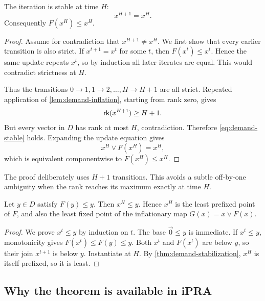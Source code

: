\begin{theorem}
\label{thm:demand-stabilization}
The iteration is stable at time \(H\):
\begin{equation}
  x^{H+1}=x^H.
  \label{eq:demand-stable}
\end{equation}
Consequently \(F(x^H)\leq x^H\).
\end{theorem}

\begin{proof}
Assume for contradiction that \(x^{H+1}\neq x^H\).  We first show that every earlier transition is also strict.  If \(x^{t+1}=x^t\) for some \(t\), then \(F(x^t)\leq x^t\).  Hence the same update repeats \(x^t\), so by induction all later iterates are equal.  This would contradict strictness at \(H\).

Thus the transitions \(0\to1,1\to2,\ldots,H\to H+1\) are all strict.  Repeated application of \cref{lem:demand-inflation}, starting from rank zero, gives
\[
  \mathsf{rk}(x^{H+1})\geq H+1.
\]
But every vector in \(D\) has rank at most \(H\), contradiction.  Therefore \eqref{eq:demand-stable} holds.  Expanding the update equation gives
\[
  x^H\vee F(x^H)=x^H,
\]
which is equivalent componentwise to \(F(x^H)\leq x^H\).
\end{proof}

The proof deliberately uses \(H+1\) transitions.  This avoids a subtle off-by-one ambiguity when the rank reaches its maximum exactly at time \(H\).

\begin{theorem}
\label{thm:demand-least}
Let \(y\in D\) satisfy \(F(y)\leq y\).  Then \(x^H\leq y\).  Hence \(x^H\) is the least prefixed point of \(F\), and also the least fixed point of the inflationary map \(G(x)=x\vee F(x)\).
\end{theorem}

\begin{proof}
We prove \(x^t\leq y\) by induction on \(t\).  The base \(\vec0\leq y\) is immediate.  If \(x^t\leq y\), monotonicity gives \(F(x^t)\leq F(y)\leq y\).  Both \(x^t\) and \(F(x^t)\) are below \(y\), so their join \(x^{t+1}\) is below \(y\).  Instantiate at \(H\).  By \cref{thm:demand-stabilization}, \(x^H\) is itself prefixed, so it is least.
\end{proof}

\subsection{Why the theorem is available in iPRA}

